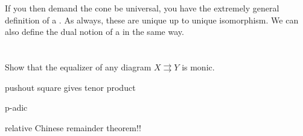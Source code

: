 If you then demand the cone be universal,
you have the extremely general definition of a .
As always, these are unique up to unique isomorphism.
We can also define the dual notion of a  in the same way.

\section{\problemhead}
\begin{sproblem}
	Show that the equalizer of any diagram $X \rightrightarrows Y$ is monic.
	\label{prob:equalizer_monic}
\end{sproblem}

pushout square gives tenor product

p-adic

relative Chinese remainder theorem!!
